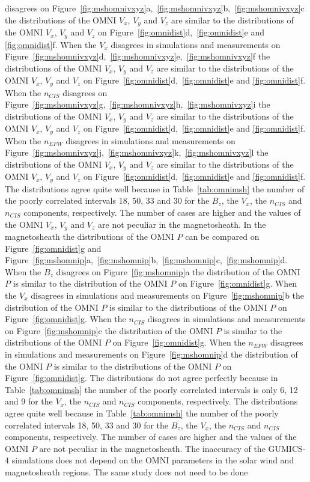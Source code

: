 \documentclass[linenumbers,draft]{agujournal}
\begin{document}
disagrees on Figure~\ref{fig:mshomnivxyz}a,~\ref{fig:mshomnivxyz}b,~\ref{fig:mshomnivxyz}c the distributions of the OMNI $V_{x}$, $V_{y}$ and $V_{z}$ are similar to the distributions of the OMNI $V_{x}$, $V_{y}$ and $V_{z}$ on Figure~\ref{fig:omnidist}d,~\ref{fig:omnidist}e and \ref{fig:omnidist}f. When the $V_{x}$ disagrees in simulations and measurements on Figure~\ref{fig:mshomnivxyz}d,~\ref{fig:mshomnivxyz}e,~\ref{fig:mshomnivxyz}f the distributions of the OMNI $V_{x}$, $V_{y}$ and $V_{z}$ are similar to the distributions of the OMNI $V_{x}$, $V_{y}$ and $V_{z}$ on Figure~\ref{fig:omnidist}d,~\ref{fig:omnidist}e and \ref{fig:omnidist}f. When the $n_{CIS}$ disagrees on Figure~\ref{fig:mshomnivxyz}g,~\ref{fig:mshomnivxyz}h,~\ref{fig:mshomnivxyz}i the distributions of the OMNI $V_{x}$, $V_{y}$ and $V_{z}$ are similar to the distributions of the OMNI $V_{x}$, $V_{y}$ and $V_{z}$ on Figure~\ref{fig:omnidist}d,~\ref{fig:omnidist}e and \ref{fig:omnidist}f. When the $n_{EFW}$ disagrees in simulations and measurements on Figure~\ref{fig:mshomnivxyz}j,~\ref{fig:mshomnivxyz}k,~\ref{fig:mshomnivxyz}l the distributions of the OMNI $V_{x}$, $V_{y}$ and $V_{z}$ are similar to the distributions of the OMNI $V_{x}$, $V_{y}$ and $V_{z}$ on Figure~\ref{fig:omnidist}d,~\ref{fig:omnidist}e and \ref{fig:omnidist}f. The distributions agree quite well because in Table~\ref{tab:omnimsh} the number of the poorly correlated intervals 18, 50, 33 and 30 for the $B_{z}$, the $V_{x}$, the $n_{CIS}$ and $n_{CIS}$ components, respectively. The number of cases are higher and the values of the OMNI $V_{x}$, $V_{y}$ and $V_{z}$ are not peculiar in the magnetosheath. In the magnetosheath the distributions of the OMNI $P$ can be compared on Figure~\ref{fig:omnidist}g and Figure~\ref{fig:mshomnip}a,~\ref{fig:mshomnip}b,~\ref{fig:mshomnip}c,~\ref{fig:mshomnip}d. When the $B_{z}$ disagrees on Figure~\ref{fig:mshomnip}a the distribution of the OMNI $P$ is similar to the distribution of the OMNI $P$ on Figure~\ref{fig:omnidist}g. When the $V_{x}$ disagrees in simulations and measurements on Figure~\ref{fig:mshomnip}b the distribution of the OMNI $P$ is similar to the distributions of the OMNI $P$ on Figure~\ref{fig:omnidist}g. When the $n_{CIS}$ disagrees in simulations and measurements on Figure~\ref{fig:mshomnip}c the distribution of the OMNI $P$ is similar to the distributions of the OMNI $P$ on Figure~\ref{fig:omnidist}g. When the $n_{EFW}$ disagrees in simulations and measurements on Figure~\ref{fig:mshomnip}d the distribution of the OMNI $P$ is similar to the distributions of the OMNI $P$ on Figure~\ref{fig:omnidist}g. The distributions do not agree perfectly because in Table~\ref{tab:omnimsh} the number of the poorly correlated intervals is only 6, 12 and 9 for the $V_{x}$, the $n_{CIS}$ and $n_{CIS}$ components, respectively. The distributions agree quite well because in Table~\ref{tab:omnimsh} the number of the poorly correlated intervals 18, 50, 33 and 30 for the $B_{z}$, the $V_{x}$, the $n_{CIS}$ and $n_{CIS}$ components, respectively. The number of cases are higher and the values of the OMNI $P$ are not peculiar in the magnetosheath. The inaccuracy of the GUMICS-4 simulations does not depend on the OMNI parameters in the solar wind and magnetosheath regions. The same study does not need to be done 
\end{document}

